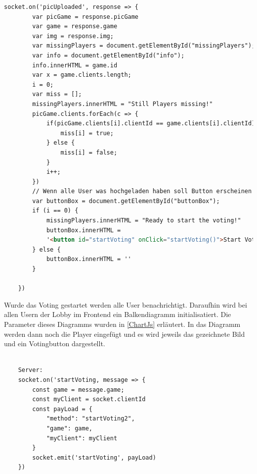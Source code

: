 \begin{lstlisting}[language=html,caption=picUploaded Client]
    socket.on('picUploaded', response => {
        var picGame = response.picGame
        var game = response.game
        var img = response.img;
        var missingPlayers = document.getElementById("missingPlayers");
        var info = document.getElementById("info");
        info.innerHTML = game.id
        var x = game.clients.length;
        i = 0;
        var miss = [];
        missingPlayers.innerHTML = "Still Players missing!"
        picGame.clients.forEach(c => {
            if(picGame.clients[i].clientId == game.clients[i].clientId){
                miss[i] = true;
            } else {
                miss[i] = false;
            }
            i++;
        })
        // Wenn alle User was hochgeladen haben soll Button erscheinen (i=0)
        var buttonBox = document.getElementById("buttonBox");
        if (i == 0) {
            missingPlayers.innerHTML = "Ready to start the voting!"
            buttonBox.innerHTML =
            '<button id="startVoting" onClick="startVoting()">Start Voting</button>'
        } else {
            buttonBox.innerHTML = ''
        }

    })
\end{lstlisting}

Wurde das Voting gestartet werden alle User benachrichtigt.
Daraufhin wird bei allen Usern der Lobby im Frontend ein Balkendiagramm initialisatiert. Die Parameter dieses Diagramms wurden in \ref*{ChartJs} erläutert.
In das Diagramm werden dann noch die Player eingefügt und es wird jeweils das gezeichnete Bild und ein Votingbutton dargestellt.
\begin{lstlisting}[language=html,caption=Start Voting Server]
    
    Server:
    socket.on('startVoting, message => {
        const game = message.game;
        const myClient = socket.clientId
        const payLoad = {
            "method": "startVoting2",
            "game": game,
            "myClient": myClient
        }
        socket.emit('startVoting', payLoad)
    })

\end{lstlisting}

